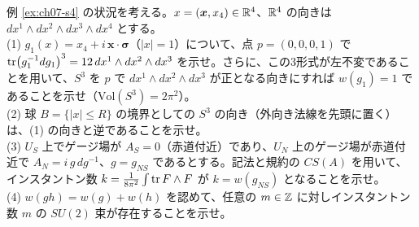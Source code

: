 \begin{problem}[難易度 C]\label{ch07-prob-s4}
例 \ref{ex:ch07-s4} の状況を考える。$x=(\bm x,x_4)\in\mathbb{R}^4$、$\mathbb{R}^4$ の向きは $dx^1\wedge dx^2\wedge dx^3\wedge dx^4$ とする。\\
(1) $g_1(x)=x_4+i\,\bm x\cdot\bm\sigma$（$\lvert x\rvert=1$）について、点 $p=(0,0,0,1)$ で $\tr(g_1^{-1}dg_1)^3=12\,dx^1\wedge dx^2\wedge dx^3$ を示せ。さらに、この3形式が左不変であることを用いて、$S^3$ を $p$ で $dx^1\wedge dx^2\wedge dx^3$ が正となる向きにすれば $w(g_1)=1$ であることを示せ（$\mathrm{Vol}(S^3)=2\pi^2$）。\\
(2) 球 $B=\{\lvert x\rvert\le R\}$ の境界としての $S^3$ の向き（外向き法線を先頭に置く）は、(1) の向きと逆であることを示せ。\\
(3) $U_S$ 上でゲージ場が $A_S=0$（赤道付近）であり、$U_N$ 上のゲージ場が赤道付近で $A_N=i\,g\,dg^{-1}$、$g=g_{NS}$ であるとする。記法と規約の $CS(A)$ を用いて、インスタントン数 $k=\frac1{8\pi^2}\int\tr F\wedge F$ が $k=w(g_{NS})$ となることを示せ。\\
(4) $w(gh)=w(g)+w(h)$ を認めて、任意の $m\in\mathbb{Z}$ に対しインスタントン数 $m$ の $SU(2)$ 束が存在することを示せ。
\end{problem}


